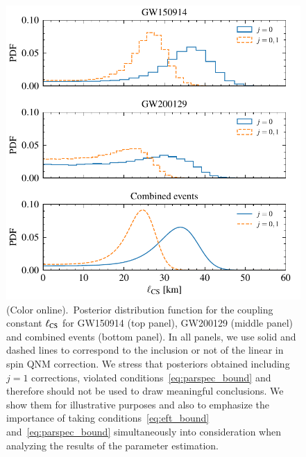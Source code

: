 \documentclass[twocolumn,prd,aps,superscriptaddress,preprintnumbers,tightenlines,showpacs,nofootinbib,amsfonts,amsmath,longbibliography]{revtex4-1}
\begin{document}
\begin{figure}[t]
\includegraphics[width=\columnwidth]{figs/dcs_posteriors_combined.pdf}
\caption{(Color online).~Posterior distribution function for the coupling constant $\ell_{\rm CS}$ for
GW150914 (top panel), GW200129 (middle panel) and combined events (bottom panel).
%
In all panels, we use solid and dashed lines to correspond to the inclusion or not of the linear
in spin QNM correction.
%
We stress that posteriors obtained including $j=1$ corrections, violated conditions~\eqref{eq:parspec_bound}
and therefore should not be used to draw meaningful conclusions. We show them for illustrative purposes
and also to emphasize the importance of taking conditions~\eqref{eq:eft_bound} and~\eqref{eq:parspec_bound}
simultaneously into consideration when analyzing the results of the parameter estimation.
}
\label{fig:dCS_exec_sum}
\end{figure}
\end{document}
